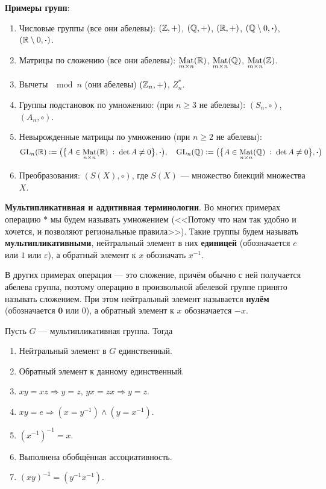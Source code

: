 \textbf{Примеры групп}:
\begin{enumerate}[nolistsep]
    \item Числовые группы (все они абелевы): $(\mathbb{Z}, +)$, $(\mathbb{Q}, +)$, $(\mathbb{R}, +)$, $(\mathbb{Q} \setminus 0, \boldsymbol{\cdot})$, $(\mathbb{R} \setminus 0, \boldsymbol{\cdot})$.
    \item Матрицы по сложению (все они абелевы): $\underset{m \times n}{\mathrm{Mat}}(\mathbb{R})$, $\underset{m \times n}{\mathrm{Mat}}(\mathbb{Q})$, $\underset{m \times n}{\mathrm{Mat}}(\mathbb{Z})$.
    \item Вычеты $\mod n$ (они абелевы) $(\mathbb{Z}_n, +)$, $Z_n^\ast$.
    \item Группы подстановок по умножению: (при $n \geqslant 3$ не абелевы): $(S_n, \circ)$, $(A_n, \circ)$.
    \item Невырожденные матрицы по умножению (при $n \geqslant 2$ не абелевы):
        $$
        \mathrm{GL}_n(\mathbb{R}) \vcentcolon= \big(\big\{A \in \underset{n \times n}{\mathrm{Mat}}(\mathbb{R})\;\vcentcolon\;\det A \ne 0\big\}, \boldsymbol{\cdot}\big),\quad
        \mathrm{GL}_n(\mathbb{Q}) \vcentcolon= \big(\big\{A \in \underset{n \times n}{\mathrm{Mat}}(\mathbb{Q})\;\vcentcolon\;\det A \ne 0\big\}, \boldsymbol{\cdot}\big)
        $$
    \item Преобразования: $(S(X), \circ)$, где $S(X)$ --- множество биекций множества $X$.
\end{enumerate}

\textbf{Мультипликативная и аддитивная терминологии}. Во многих примерах операцию $\ast$ мы будем называть умножением (<<Потому что нам так удобно и хочется, и позволяют региональные правила>>). Такие группы будем называть \textbf{мультипликативными}, нейтральный элемент в них \textbf{единицей} (обозначается $e$ или $1$ или $\varepsilon$), а обратный элемент к $x$ обозначать $x^{-1}$.

В других примерах операция --- это сложение, причём обычно с ней получается абелева группа, поэтому операцию в произвольной абелевой группе принято называть сложением. При этом нейтральный элемент называется \textbf{нулём} (обозначается $\boldsymbol{0}$ или $0$), а обратный элемент к $x$ обозначается $-x$.

\begin{theorem}
    Пусть $G$ --- мультипликативная группа. Тогда
    \begin{enumerate}[nolistsep]
        \item Нейтральный элемент в $G$ единственный.
        \item Обратный элемент к данному единственный.
        \item $xy = xz \Rightarrow y = z$, $yx = zx \Rightarrow y = z$.
        \item $xy = e \Rightarrow (x = y^{-1}) \wedge (y = x^{-1})$.
        \item $(x^{-1})^{-1} = x$.
        \item Выполнена обобщённая ассоциативность.
        \item $(xy)^{-1} = (y^{-1}x^{-1})$.
    \end{enumerate}
\end{theorem}

